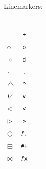 \documentclass[a4paper]{article}
\begin{document}
\hfill
\begin{minipage}{2cm}
  Linemarkers:\\ \\
  \begin{tabular}{l|c}
    + & \texttt{+} \\
    o & \texttt{o} \\
    $\diamond$ & \texttt{d} \\
    $\cdot$ & \texttt{.} \\
    $\triangle$ & \texttt{\^{}} \\
    $\nabla$ &\texttt{v} \\
    $\lhd$ & \texttt{<} \\
    $\rhd$ & \texttt{>} \\
    $\odot$ & \texttt{\#.} \\
    $\boxplus$ & \texttt{\#+} \\
    $\boxtimes$ & \texttt{\#x} 
  \end{tabular}
\end{minipage}
\end{document}
